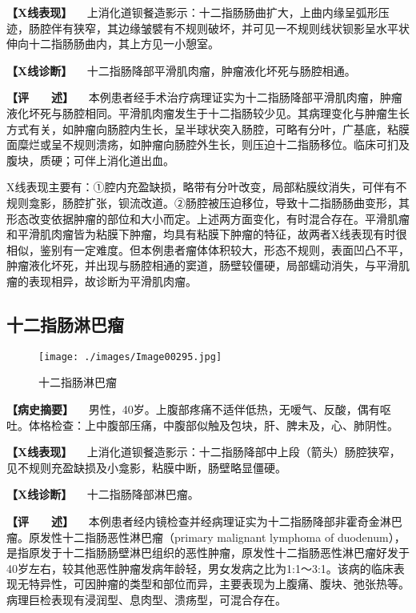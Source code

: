 \textbf{【X线表现】}
　上消化道钡餐造影示：十二指肠肠曲扩大，上曲内缘呈弧形压迹，肠腔伴有狭窄，其边缘皱襞有不规则破坏，并可见一不规则线状钡影呈水平状伸向十二指肠肠曲内，其上方见一小憩室。

\textbf{【X线诊断】} 　十二指肠降部平滑肌肉瘤，肿瘤液化坏死与肠腔相通。

\textbf{【评　　述】}
　本例患者经手术治疗病理证实为十二指肠降部平滑肌肉瘤，肿瘤液化坏死与肠腔相同。平滑肌肉瘤发生于十二指肠较少见。其病理变化与肿瘤生长方式有关，如肿瘤向肠腔内生长，呈半球状突入肠腔，可略有分叶，广基底，粘膜面糜烂或呈不规则溃疡，如肿瘤向肠腔外生长，则压迫十二指肠移位。临床可扪及腹块，质硬；可伴上消化道出血。

X线表现主要有：①腔内充盈缺损，略带有分叶改变，局部粘膜纹消失，可伴有不规则龛影，肠腔扩张，钡流改道。②肠腔被压迫移位，导致十二指肠肠曲变形，其形态改变依据肿瘤的部位和大小而定。上述两方面变化，有时混合存在。平滑肌瘤和平滑肌肉瘤皆为粘膜下肿瘤，均具有粘膜下肿瘤的特征，故两者X线表现有时很相似，鉴别有一定难度。但本例患者瘤体体积较大，形态不规则，表面凹凸不平，肿瘤液化坏死，并出现与肠腔相通的窦道，肠壁较僵硬，局部蠕动消失，与平滑肌瘤的表现相异，故诊断为平滑肌肉瘤。

\subsection{十二指肠淋巴瘤}

\begin{figure}[!htbp]
 \centering
 \texttt{[image: ./images/Image00295.jpg]}
 \captionsetup{justification=centering}
 \caption{十二指肠淋巴瘤}
 \label{fig5-4-9}
  \end{figure} 

\textbf{【病史摘要】}
　男性，40岁。上腹部疼痛不适伴低热，无嗳气、反酸，偶有呕吐。体格检查：上中腹部压痛，中腹部似触及包块，肝、脾未及，心、肺阴性。

\textbf{【X线表现】}
　上消化道钡餐造影示：十二指肠降部中上段（箭头）肠腔狭窄，见不规则充盈缺损及小龛影，粘膜中断，肠壁略显僵硬。

\textbf{【X线诊断】} 　十二指肠降部淋巴瘤。

\textbf{【评　　述】}
　本例患者经内镜检查并经病理证实为十二指肠降部非霍奇金淋巴瘤。原发性十二指肠恶性淋巴瘤（primary
malignant lymphoma of
duodenum），是指原发于十二指肠肠壁淋巴组织的恶性肿瘤，原发性十二指肠恶性淋巴瘤好发于40岁左右，较其他恶性肿瘤发病年龄轻，男女发病之比为1:1～3:1。该病的临床表现无特异性，可因肿瘤的类型和部位而异，主要表现为上腹痛、腹块、弛张热等。病理巨检表现有浸润型、息肉型、溃疡型，可混合存在。

